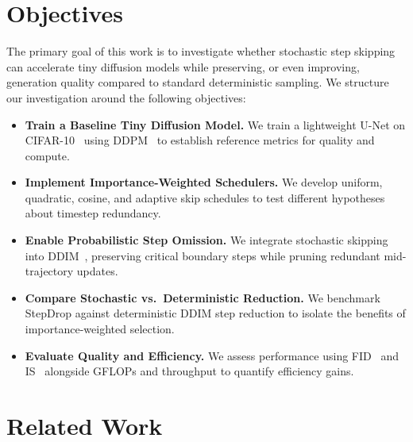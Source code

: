 \documentclass{article}
\begin{document}
\section{Objectives}
\label{sec:objectives}

The primary goal of this work is to investigate whether stochastic step skipping can accelerate tiny diffusion models while preserving, or even improving, generation quality compared to standard deterministic sampling. We structure our investigation around the following objectives:

\begin{itemize}
    \item \textbf{Train a Baseline Tiny Diffusion Model.} We train a lightweight U-Net on CIFAR-10~\citep{krizhevsky2009learning} using DDPM~\citep{ho2020denoising} to establish reference metrics for quality and compute.

    \item \textbf{Implement Importance-Weighted Schedulers.} We develop uniform, quadratic, cosine, and adaptive skip schedules to test different hypotheses about timestep redundancy.

    \item \textbf{Enable Probabilistic Step Omission.} We integrate stochastic skipping into DDIM~\citep{song2020denoising}, preserving critical boundary steps while pruning redundant mid-trajectory updates.

    \item \textbf{Compare Stochastic vs.\ Deterministic Reduction.} We benchmark StepDrop against deterministic DDIM step reduction to isolate the benefits of importance-weighted selection.

    \item \textbf{Evaluate Quality and Efficiency.} We assess performance using FID~\citep{heusel2017gans} and IS~\citep{salimans2016improved} alongside GFLOPs and throughput to quantify efficiency gains.
\end{itemize}

\section{Related Work}
\label{sec:related}
\end{document}
